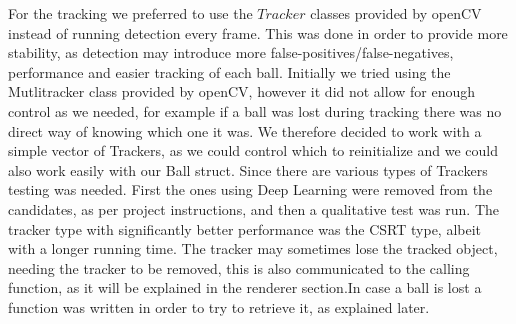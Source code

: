 For the tracking we preferred to use the $Tracker$ classes provided by openCV
instead of running detection every frame. This was done in order to provide more
stability, as detection may introduce more false-positives/false-negatives, performance
and easier tracking of each ball. Initially we tried using the Mutlitracker class
provided by openCV, however it did not allow for enough control as we needed, for 
example if a ball was lost during tracking there was no direct way of knowing which
one it was. We therefore decided to work with a simple vector of Trackers, as we could
control which to reinitialize and we could also work easily with our Ball struct.
Since there are various types of Trackers testing was needed. First the ones using
Deep Learning were removed from the candidates, as per project instructions, and then
a qualitative test was run. The tracker type with significantly better performance
was the CSRT type, albeit with a longer running time. The tracker may sometimes
lose the tracked object, needing the tracker to be removed, this is also communicated
to the calling function, as it will be explained in the renderer section.In case 
a ball is lost a function was written in order to try to retrieve it, as explained later.

